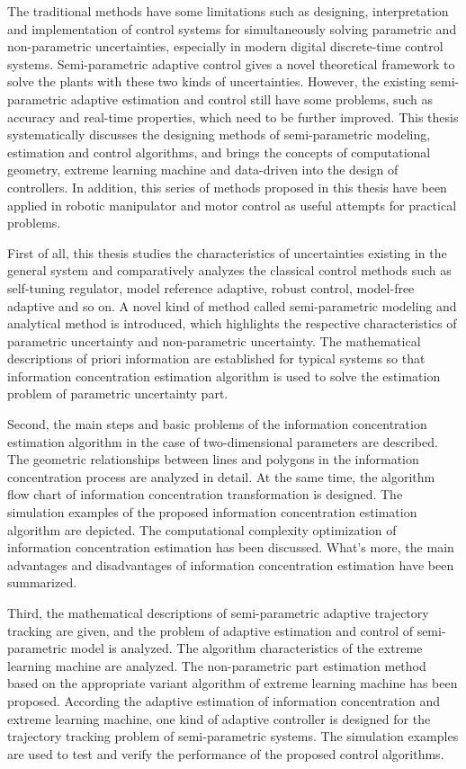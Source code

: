 \begin{englishabstract}

The traditional methods have some limitations such as designing, interpretation and implementation of control  systems for simultaneously solving parametric and non-parametric uncertainties, especially in modern digital discrete-time control systems. Semi-parametric adaptive control gives a novel theoretical framework to solve the plants with these two kinds of uncertainties. However, the existing semi-parametric adaptive estimation and control still have some problems, such as accuracy and real-time properties, which need to be further improved. This thesis systematically discusses the designing methods of semi-parametric modeling, estimation and control algorithms, and brings the concepts of computational geometry, extreme learning machine and data-driven into the design of controllers. In addition, this series of methods proposed in this thesis have been applied in robotic manipulator and motor control as useful attempts for practical problems. 

First of all, this thesis studies the characteristics of uncertainties existing in the general system and comparatively analyzes the classical control methods such as self-tuning regulator, model reference adaptive, robust control, model-free adaptive and so on. A novel kind of method called semi-parametric modeling and analytical method is introduced, which highlights the respective characteristics of parametric uncertainty and non-parametric uncertainty. The mathematical descriptions of priori information are established for typical systems so that information concentration estimation algorithm is used to solve the estimation problem of parametric uncertainty part.

Second, the main steps and basic problems of the information concentration estimation algorithm in the case of two-dimensional parameters are described. The geometric relationships between lines and polygons in the information concentration process are analyzed in detail. At the same time, the algorithm flow chart of information concentration transformation is designed. The simulation examples of the proposed information concentration estimation algorithm are depicted. The computational complexity optimization of information concentration estimation has been discussed. What's more, the main advantages and disadvantages of information concentration estimation have been summarized.

Third, the mathematical descriptions of semi-parametric adaptive trajectory tracking are given, and the problem of adaptive estimation and control of semi-parametric model is analyzed. The algorithm characteristics of the extreme learning machine are analyzed. The non-parametric part estimation method based on the appropriate variant algorithm of extreme learning machine has been proposed. According the adaptive estimation of information concentration and extreme learning machine, one kind of adaptive controller is designed for the trajectory tracking problem of semi-parametric systems. The simulation examples are used to test and verify the performance of the proposed control algorithms.


\end{englishabstract}
